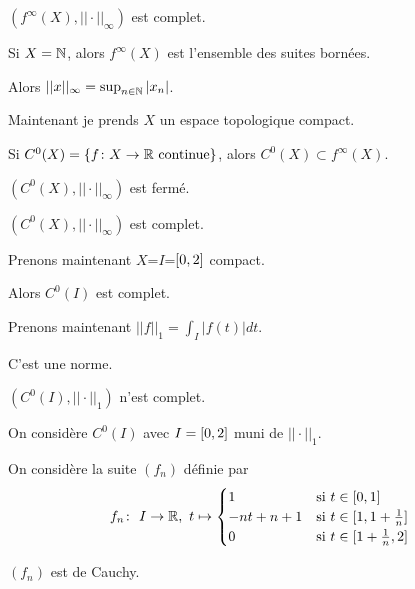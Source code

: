 \documentclass[french,a4paper,10pt]{article}
\begin{document}
    \begin{proposition}
        $(f^\infty(X), ||\cdot||_\infty)$ est complet.
    \end{proposition}

    \begin{remark}
        Si $X=\mathbb{N}$, alors $f^\infty(X)$ est l'ensemble des suites bornées.

        Alors $|| x ||_\infty = \sup_{n\in\mathbb{N}}|x_n|$.
    \end{remark}

    Maintenant je prends $X$ un espace topologique compact.

    Si $C^0(X)=\{f\colon X\to\mathbb{R}\text{ continue}\}$, alors $C^0(X)\subset f^\infty(X)$.

    \begin{proposition}
        $(C^0(X), ||\cdot||_\infty)$ est fermé.
    \end{proposition}

    \begin{corollaire}
        $(C^0(X), ||\cdot||_\infty)$ est complet.
    \end{corollaire}

    Prenons maintenant $X$=$I$=$\mathopen{[}0, 2\mathclose{]}$ compact.

    Alors $C^0(I)$ est complet.

    Prenons maintenant $||f||_1 = \int_I |f(t)| dt$.

    C'est une norme.

    \begin{proposition}
        $(C^0(I), ||\cdot||_1)$ n'est  complet.
    \end{proposition}

    On considère $C^0(I)$ avec $I=\mathopen{[}0,2\mathclose{]}$ muni de $||\cdot||_1$.

    On considère la suite $(f_n)$ définie par
    \[
        f_n\colon\ I\to\mathbb{R},\ t\mapsto \begin{cases}
            1&\text{si }t\in\mathopen{[}0,1\mathclose{]}\\
            -nt+n+1 &\text{si }t\in\mathopen{[}1,1+\frac1n\mathclose{]}\\
            0&\text{si }t\in\mathopen{[}1+\frac1n,2\mathclose{]}
        \end{cases}
    \]

    $(f_n)$ est de Cauchy.
\end{document}
